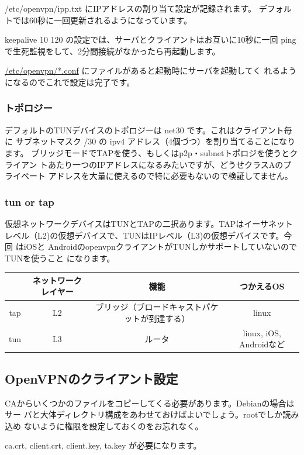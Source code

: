 \documentclass[mingoth,a4paper]{jsarticle}
\begin{document}
/etc/openvpn/ipp.txt にIPアドレスの割り当て設定が記録されます。
デフォルトでは60秒に一回更新されるようになっています。

keepalive 10 120 の設定では、サーバとクライアントはお互いに10秒に一回
ping で生死監視をして、2分間接続がなかったら再起動します。

\url{ /etc/openvpn/*.conf} にファイルがあると起動時にサーバを起動してく
れるようになるのでこれで設定は完了です。

\subsubsection{トポロジー}

デフォルトのTUNデバイスのトポロジーは net30 です。これはクライアント毎に
サブネットマスク /30 の ipv4 アドレス（4個づつ）を割り当てることになります。
ブリッジモードでTAPを使う、もしくはp2p・subnetトポロジを使うとクライアン
トあたり一つのIPアドレスになるみたいですが、どうせクラスAのプライベート
アドレスを大量に使えるので特に必要もないので検証してません。

\subsubsection{tun or tap}

仮想ネットワークデバイスはTUNとTAPの二択あります。TAPはイーサネット
レベル（L2)の仮想デバイスで、TUNはIPレベル（L3)の仮想デバイスです。今回
はiOSと
AndroidのopenvpnクライアントがTUNしかサポートしていないのでTUNを使うこと
になります。

\begin{tabular}{|c|c|c|c|}
\hline
 & ネットワークレイヤー & 機能 & つかえるOS\\
\hline
tap & L2 & ブリッジ（ブロードキャストパケットが到達する） & linux \\
tun & L3 & ルータ & linux, iOS, Androidなど \\
\hline
\hline
\end{tabular}


\subsection{OpenVPNのクライアント設定}

CAからいくつかのファイルをコピーしてくる必要があります。Debianの場合はサー
バと大体ディレクトリ構成をあわせておけばよいでしょう。rootでしか読み込め
ないように権限を設定しておくのをお忘れなく。

ca.crt, client.crt, client.key, ta.key が必要になります。
\end{document}
